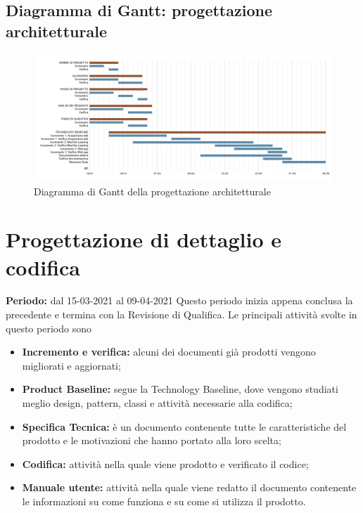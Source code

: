 \subsection{Diagramma di Gantt: progettazione architetturale}\label{PianificazioneDiagrammaDiGanttProgettazioneArchitetturale}
\begin{figure}[h]
	\begin{center}
		\includegraphics[width=0.9\linewidth]{../immagini/pdp/gantt_progettazione_architetturale.png}
		\caption{Diagramma di Gantt della progettazione architetturale}
	\end{center}
\end{figure}
\section{Progettazione di dettaglio e codifica}\label{PianificazioneProgettazioneDettaglio}
\textbf{Periodo:} dal 15-03-2021 al 09-04-2021
Questo periodo inizia appena conclusa la precedente e termina con la Revisione di Qualifica.
Le principali attività svolte in questo periodo sono
\begin{itemize}
	\item \textbf{Incremento e verifica:} alcuni dei documenti già prodotti vengono migliorati e aggiornati;
	\item \textbf{Product Baseline:} segue la Technology Baseline, dove vengono studiati meglio design, pattern, classi e attività necessarie alla codifica;
	\item \textbf{Specifica Tecnica:} è un documento contenente tutte le caratteristiche del prodotto e le motivazioni che hanno portato alla loro scelta;
	\item \textbf{Codifica:} attività nella quale viene prodotto e verificato il codice;
	\item \textbf{Manuale utente:} attività nella quale viene redatto il documento contenente le informazioni su come funziona e su come si utilizza il prodotto.
\end{itemize}
